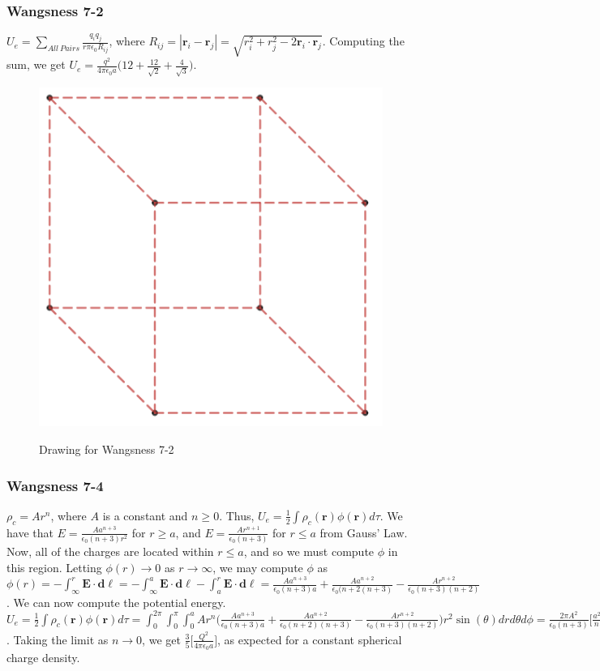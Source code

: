 \documentclass{article}
\theoremstyle{mystyle}
\begin{document}
\subsubsection{Wangsness 7-2}
$U_e = \underset{All\ Pairs}\sum\frac{q_i q_j}{r\pi \epsilon_0 R_{ij}}$, where $R_{ij} = |\mathbf{r}_i-\mathbf{r}_j| = \sqrt{r_i^2+r_j^2 -2\mathbf{r}_i\cdot \mathbf{r}_j}$. Computing the sum, we get $U_e = \frac{q^2}{4\pi \epsilon_0 a}\big(12 + \frac{12}{\sqrt{2}}+\frac{4}{\sqrt{3}}\big)$.
\begin{figure}[htbp]
    \centering
    {\includegraphics[scale=0.4]{7-2.png}}
    \caption{Drawing for Wangsness 7-2}
\end{figure}
\subsubsection{Wangsness 7-4}
$\rho_c = Ar^n$, where $A$ is a constant and $n\geq 0$. Thus, $U_e = \frac{1}{2} \int \rho_c(\mathbf{r})\phi(\mathbf{r})d\tau$. We have that $E = \frac{Aa^{n+3}}{\epsilon_0 (n+3)r^2}$ for $r\geq a$, and $E=\frac{Ar^{n+1}}{\epsilon_0(n+3)}$ for $r\leq a$ from Gauss' Law. Now, all of the charges are located within $r\leq a$, and so we must compute $\phi$ in this region. Letting $\phi(r)\rightarrow 0$ as $r\rightarrow \infty$, we may compute $\phi$ as $\phi(r) = -\int_{\infty}^{r}\mathbf{E}\cdot \mathbf{d\ell} = -\int_{\infty}^{a} \mathbf{E}\cdot \mathbf{d\ell} - \int_{a}^{r}\mathbf{E}\cdot \mathbf{d\ell} = \frac{Aa^{n+3}}{\epsilon_0(n+3)a}+\frac{Aa^{n+2}}{\epsilon_0(n+2(n+3)}-\frac{Ar^{n+2}}{\epsilon_0(n+3)(n+2)}$. We can now compute  the potential energy. $U_e =\frac{1}{2}\int \rho_c(\mathbf{r})\phi(\mathbf{r})d\tau = \int_{0}^{2\pi} \int_{0}^{\pi}\int_{0}^{a} A r^n \bigg(\frac{Aa^{n+3}}{\epsilon_0(n+3)a}+\frac{Aa^{n+2}}{\epsilon_0(n+2)(n+3)}-\frac{Ar^{n+2}}{\epsilon_0(n+3)(n+2)}\bigg)r^2 \sin(\theta)dr d\theta d\phi = \frac{2\pi A^2}{\epsilon_0 (n+3)}\bigg[\frac{a^{2n+5}}{n+3}+\frac{a^{2n+5}}{(n+2)(n+3)}-\frac{a^{2n+5}}{(n+2)(2n+5)}\bigg]$. Taking the limit as $n\rightarrow 0$, we get $\frac{3}{5}\bigg[\frac{Q^2}{4\pi \epsilon_0 a}\bigg]$, as expected for a constant spherical charge density.
\end{document}
